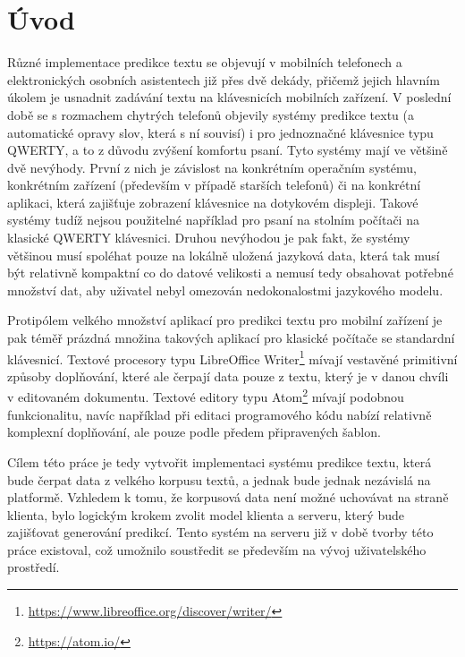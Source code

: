 \documentclass[a4paper,11pt]{article}
\begin{document}

\tableofcontents

\newpage

\section*{Úvod}

Různé implementace predikce textu se objevují v mobilních telefonech a elektronických osobních asistentech již přes dvě dekády, přičemž jejich hlavním úkolem je usnadnit zadávání textu na klávesnicích mobilních zařízení. V poslední době se s rozmachem chytrých telefonů objevily systémy predikce textu (a automatické opravy slov, která s ní souvisí) i pro jednoznačné klávesnice typu QWERTY, a to z důvodu zvýšení komfortu psaní. Tyto systémy mají ve většině dvě nevýhody. První z nich je závislost na konkrétním operačním systému, konkrétním zařízení (především v případě starších telefonů) či na konkrétní aplikaci, která zajišťuje zobrazení klávesnice na dotykovém displeji. Takové systémy tudíž nejsou použitelné například pro psaní na stolním počítači na klasické QWERTY klávesnici. Druhou nevýhodou je pak fakt, že systémy většinou musí spoléhat pouze na lokálně uložená jazyková data, která tak musí být relativně kompaktní co do datové velikosti a nemusí tedy obsahovat potřebné množství dat, aby uživatel nebyl omezován nedokonalostmi jazykového modelu.

Protipólem velkého množství aplikací pro predikci textu pro mobilní zařízení je pak téměř prázdná množina takových aplikací pro klasické počítače se standardní klávesnicí. Textové procesory typu LibreOffice Writer\footnote{\url{https://www.libreoffice.org/discover/writer/}} mívají vestavěné primitivní způsoby doplňování, které ale čerpají data pouze z textu, který je v danou chvíli v editovaném dokumentu. Textové editory typu Atom\footnote{\url{https://atom.io/}} mívají podobnou funkcionalitu, navíc například při editaci programového kódu nabízí relativně komplexní doplňování, ale pouze podle předem připravených šablon.

Cílem této práce je tedy vytvořit implementaci systému predikce textu, která bude čerpat data z velkého korpusu textů, a jednak bude jednak nezávislá na platformě. Vzhledem k tomu, že korpusová data není možné uchovávat na straně klienta, bylo logickým krokem zvolit model klienta a serveru, který bude zajišťovat generování predikcí. Tento systém na serveru již v době tvorby této práce existoval, což umožnilo soustředit se především na vývoj uživatelského prostředí. 
\end{document}
